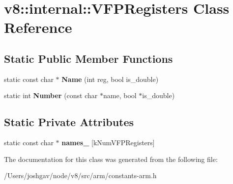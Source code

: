\hypertarget{classv8_1_1internal_1_1_v_f_p_registers}{}\section{v8\+:\+:internal\+:\+:V\+F\+P\+Registers Class Reference}
\label{classv8_1_1internal_1_1_v_f_p_registers}
\subsection*{Static Public Member Functions}
\begin{DoxyCompactItemize}
\item 
static const char $\ast$ {\bfseries Name} (int reg, bool is\+\_\+double)\hypertarget{classv8_1_1internal_1_1_v_f_p_registers_af126a5fda9266f16b81d32710f650de0}{}\label{classv8_1_1internal_1_1_v_f_p_registers_af126a5fda9266f16b81d32710f650de0}

\item 
static int {\bfseries Number} (const char $\ast$name, bool $\ast$is\+\_\+double)\hypertarget{classv8_1_1internal_1_1_v_f_p_registers_ae0468859bf8d053c051b624527c11a6f}{}\label{classv8_1_1internal_1_1_v_f_p_registers_ae0468859bf8d053c051b624527c11a6f}

\end{DoxyCompactItemize}
\subsection*{Static Private Attributes}
\begin{DoxyCompactItemize}
\item 
static const char $\ast$ {\bfseries names\+\_\+} \mbox{[}k\+Num\+V\+F\+P\+Registers\mbox{]}\hypertarget{classv8_1_1internal_1_1_v_f_p_registers_a15d455fa84456f23f3eadf8625aacb19}{}\label{classv8_1_1internal_1_1_v_f_p_registers_a15d455fa84456f23f3eadf8625aacb19}

\end{DoxyCompactItemize}


The documentation for this class was generated from the following file\+:\begin{DoxyCompactItemize}
\item 
/\+Users/joshgav/node/v8/src/arm/constants-\/arm.\+h\end{DoxyCompactItemize}
